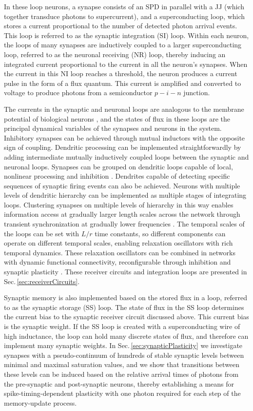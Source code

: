\documentclass[aip,amsmath,amssymb,reprint,nofootinbib]{revtex4-1}
\begin{document}
In these loop neurons, a synapse consists of an SPD in parallel with a JJ (which together transduce photons to supercurrent), and a superconducting loop, which stores a current proportional to the number of detected photon arrival events. This loop is referred to as the synaptic integration (SI) loop. Within each neuron, the loops of many synapses are inductively coupled to a larger superconducting loop, referred to as the neuronal receiving (NR) loop, thereby inducing an integrated current proportional to the current in all the neuron's synapses. When the current in this NI loop reaches a threshold, the neuron produces a current pulse in the form of a flux quantum. This current is amplified and converted to voltage to produce photons from a semiconductor $p-i-n$ junction.

The currents in the synaptic and neuronal loops are analogous to the membrane potential of biological neurons \cite{daab2001}, and the states of flux in these loops are the principal dynamical variables of the synapses and neurons in the system. Inhibitory synapses can be achieved through mutual inductors with the opposite sign of coupling. Dendritic processing can be implemented straightforwardly by adding intermediate mutually inductively coupled loops between the synaptic and neuronal loops. Synapses can be grouped on dendritic loops capable of local, nonlinear processing and inhibition \cite{sase2001,bu2006,robu2015}. Dendrites capable of detecting specific sequences of synaptic firing events \cite{thde2001,haah2015} can also be achieved. Neurons with multiple levels of dendritic hierarchy can be implemented as multiple stages of integrating loops. Clustering synapses on multiple levels of hierarchy in this way enables information access at gradually larger length scales across the network through transient synchronization at gradually lower frequencies \cite{stsa2000}. The temporal scales of the loops can be set with $L/r$ time constants, so different components can operate on different temporal scales, enabling relaxation oscillators with rich temporal dynamics. These relaxation oscillators can be combined in networks with dynamic functional connectivity, reconfigurable through inhibition and synaptic plasticity \cite{robu2015,fr2015}. These receiver circuits and integration loops are presented in Sec.\,\ref{sec:receiverCircuits}.

Synaptic memory is also implemented based on the stored flux in a loop, referred to as the synaptic storage (SS) loop. The state of flux in the SS loop determines the current bias to the synaptic receiver circuit discussed above. This current bias is the synaptic weight. If the SS loop is created with a superconducting wire of high inductance, the loop can hold many discrete states of flux, and therefore can implement many synaptic weights. In Sec.\,\ref{sec:synapticPlasticity} we investigate synapses with a pseudo-continuum of hundreds of stable synaptic levels between minimal and maximal saturation values, and we show that transitions between these levels can be induced based on the relative arrival times of photons from the pre-synaptic and post-synaptic neurons, thereby establishing a means for spike-timing-dependent plasticity with one photon required for each step of the memory-update process. 
\end{document}
